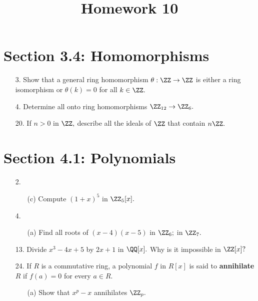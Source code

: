 \documentclass{article}
\begin{document}
\title{Homework 10}
\maketitle
\thispagestyle{fancy}

\section*{Section 3.4: Homomorphisms}

\begin{itemize}
	\item[3.] Show that a general ring homomorphism $\theta:\ZZ\to \ZZ$ is either a ring isomorphism or $\theta(k)=0$ for all $k\in \ZZ.$

	\item[4.] Determine all onto ring homomorphisms $\ZZ_{12}\to\ZZ_6.$

	\item[20.] If $n>0$ in $\ZZ,$ describe all the ideals of $\ZZ$ that contain $n\ZZ.$
		
\end{itemize}

\section*{Section 4.1: Polynomials}

\begin{itemize}
	\item[2.]
		\begin{itemize}
			\item[(c)] Compute $(1+x)^5$ in $\ZZ_5[x].$
				
		\end{itemize}

	\item[4.]
		\begin{itemize}
			\item[(a)] Find all roots of $(x-4)(x-5)$ in $\ZZ_6;$ in $\ZZ_7.$
				
		\end{itemize}

	\item[13.] Divide $x^3-4x+5$ by $2x+1$ in $\QQ[x].$ Why is it impossible in $\ZZ[x]?$

	\item[24.] If $R$ is a commutative ring, a polynomial $f$ in $R[x]$ is said to \textbf{annihilate} $R$ if $f(a)=0$ for every $a\in R.$ 
		\begin{itemize}
			\item[(a)] Show that $x^p-x$ annihilates $\ZZ_p.$
				
		\end{itemize}
		
\end{itemize}
\end{document}
